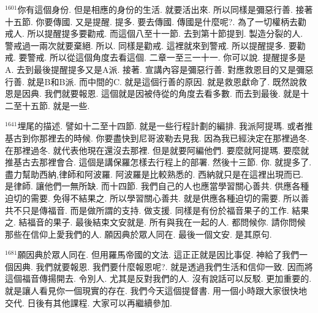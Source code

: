 \documentclass{book}
\begin{document}
$^{1601}$你有這個身份.
但是相應的身份的生活.
就要活出來.
所以同樣是彌惡行善.
接著十五節.
你要傳國.
又是提醒.
提多.
要去傳國.
傳國是什麼呢?.
為了一切權柄去勸戒人.
所以提醒提多要勸戒.
而這個八至十一節.
去到第十節提到.
製造分裂的人.
警戒過一兩次就要棄絕.
所以.
同樣是勸戒.
這裡就來到警戒.
所以提醒提多.
要勸戒.
要警戒.
所以從這個角度去看這個.
二章一至三一十一.
你可以說.
提醒提多是A.
去到最後提醒提多又是A派.
接著.
宣講內容是彌惡行善.
對應救恩目的又是彌惡行善.
就是B和B派.
而中間的C.
就是這個行善的原因.
就是救恩獻命了.
既然說救恩是因典.
我們就要報恩.
這個就是因被侍從的角度去看多數.
而去到最後.
就是十二至十五節.
就是一些.

$^{1641}$埋尾的描述.
譬如十二至十四節.
就是一些行程計劃的編排.
我派阿提瑪.
或者推基古到你那裡去的時候.
你要盡快到尼哥波勒去見我.
因為我已經決定在那裡過冬.
在那裡過冬.
就代表他現在還沒去那裡.
但是就要阿編他們.
要麼就阿提瑪.
要麼就推基古去那裡會合.
這個是講保羅怎樣去行程上的部署.
然後十三節.
你.
就提多了.
盡力幫助西納,律師和阿波羅.
阿波羅是比較熟悉的.
西納就只是在這裡出現而已.
是律師.
讓他們一無所缺.
而十四節.
我們自己的人也應當學習關心善共.
供應各種迫切的需要.
免得不結果之.
所以學習關心善共.
就是供應各種迫切的需要.
所以善共不只是傳福音.
而是做所謂的支持.
做支援.
同樣是有份於福音果子的工作.
結果之.
結福音的果子.
最後結束文安就是.
所有與我在一起的人.
都問候你.
請你問候那些在信仰上愛我們的人.
願因典於眾人同在.
最後一個文安.
是其原句.

$^{1681}$願因典於眾人同在.
但用羅馬帝國的文法.
這正正就是因比事促.
神給了我們一個因典.
我們就要報恩.
我們要什麼報恩呢?.
就是透過我們生活和信仰一致.
因而將這個福音傳揚開去.
令別人.
尤其是反對我們的人.
沒有說話可以反駁.
更加重要的.
就是讓人看見你一個現實的存在.
我們今天這個提督書.
用一個小時跟大家很快地交代.
日後有其他課程.
大家可以再繼續參加.
\newpage
\end{document}
